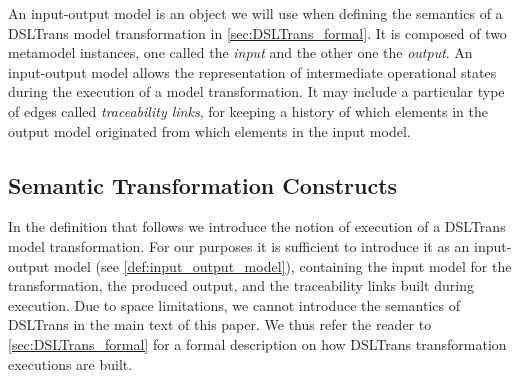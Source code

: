 
An input-output model is an object we will use when defining the semantics of a DSLTrans model transformation in \cref{sec:DSLTrans_formal}. It is composed of two metamodel instances, one called the \emph{input} and the other one the \emph{output}. An input-output model allows the representation of intermediate operational states during the execution of a model transformation. It may include a particular type of edges called \emph{traceability links}, for keeping a history of which elements in the output model originated from which elements in the input model.


\subsection{Semantic Transformation Constructs}
\label{sec:DSLTrans_semantics}

In the definition that follows we introduce the notion of execution of a DSLTrans model transformation. For our purposes it is sufficient to introduce it as an input-output model (see \cref{def:input_output_model}), containing the input model for the transformation, the produced output, and the traceability links built during execution. Due to space limitations, we cannot introduce the semantics of DSLTrans in the main text of this paper. We thus refer the reader to \cref{sec:DSLTrans_formal} for a formal description on how DSLTrans transformation executions are built. 


